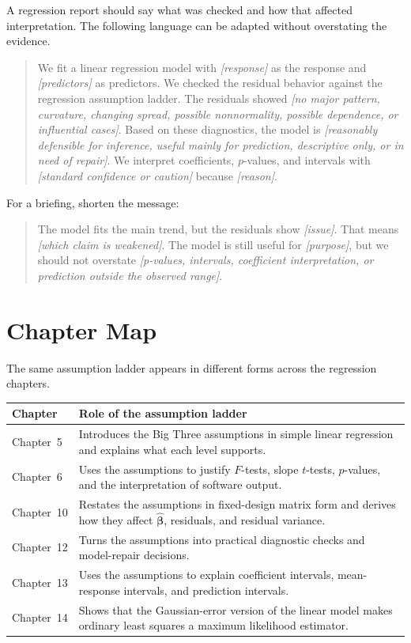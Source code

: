 A regression report should say what was checked and how that affected interpretation.  The following language can be adapted without overstating the evidence.

\begin{quote}
We fit a linear regression model with \emph{[response]} as the response and \emph{[predictors]} as predictors.  We checked the residual behavior against the regression assumption ladder.  The residuals showed \emph{[no major pattern, curvature, changing spread, possible nonnormality, possible dependence, or influential cases]}.  Based on these diagnostics, the model is \emph{[reasonably defensible for inference, useful mainly for prediction, descriptive only, or in need of repair]}.  We interpret coefficients, \(p\)-values, and intervals with \emph{[standard confidence or caution]} because \emph{[reason]}.
\end{quote}

For a briefing, shorten the message:
\begin{quote}
The model fits the main trend, but the residuals show \emph{[issue]}.  That means \emph{[which claim is weakened]}.  The model is still useful for \emph{[purpose]}, but we should not overstate \emph{[p-values, intervals, coefficient interpretation, or prediction outside the observed range]}.
\end{quote}

\section{Chapter Map}

The same assumption ladder appears in different forms across the regression chapters.

\begin{center}
\begin{tabular}{>{\raggedright\arraybackslash}p{}>{\raggedright\arraybackslash}p{}}
\toprule
\textbf{Chapter} & \textbf{Role of the assumption ladder} \\
\midrule
Chapter~5 & Introduces the Big Three assumptions in simple linear regression and explains what each level supports. \\
Chapter~6 & Uses the assumptions to justify \(F\)-tests, slope \(t\)-tests, \(p\)-values, and the interpretation of software output. \\
Chapter~10 & Restates the assumptions in fixed-design matrix form and derives how they affect \(\widehat{\boldsymbol{\beta}}\), residuals, and residual variance. \\
Chapter~12 & Turns the assumptions into practical diagnostic checks and model-repair decisions. \\
Chapter~13 & Uses the assumptions to explain coefficient intervals, mean-response intervals, and prediction intervals. \\
Chapter~14 & Shows that the Gaussian-error version of the linear model makes ordinary least squares a maximum likelihood estimator. \\
\bottomrule
\end{tabular}
\end{center}

